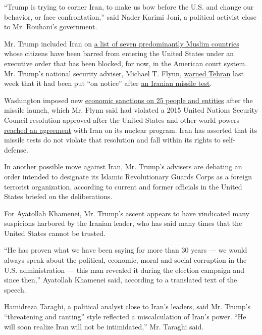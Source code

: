 ``Trump is trying to corner Iran, to make us bow before the U.S. and
change our behavior, or face confrontation,'' said Nader Karimi Joni, a
political activist close to Mr. Rouhani's government.

Mr. Trump included Iran on
\href{https://www.nytimes3xbfgragh.onion/interactive/2017/01/31/us/politics/trump-immigration-ban-groups.html}{a
list of seven predominantly Muslim countries} whose citizens have been
barred from entering the United States under an executive order that has
been blocked, for now, in the American court system. Mr. Trump's
national security adviser, Michael T. Flynn,
\href{https://www.nytimes3xbfgragh.onion/2017/02/01/world/middleeast/iran-missile-test.html}{warned
Tehran} last week that it had been put ``on notice'' after
\href{https://www.nytimes3xbfgragh.onion/2017/01/30/world/middleeast/iran-missile-test.html}{an
Iranian missile test}.

Washington imposed new
\href{https://www.nytimes3xbfgragh.onion/2017/02/03/us/politics/iran-sanctions-trump.html}{economic
sanctions on 25 people and entities} after the missile launch, which Mr.
Flynn said had violated a 2015 United Nations Security Council
resolution approved after the United States and other world powers
\href{https://www.nytimes3xbfgragh.onion/interactive/2015/03/31/world/middleeast/simple-guide-nuclear-talks-iran-us.html}{reached
an agreement} with Iran on its nuclear program. Iran has asserted that
its missile tests do not violate that resolution and fall within its
rights to self-defense.

In another possible move against Iran, Mr. Trump's advisers are debating
an order intended to designate its Islamic Revolutionary Guards Corps as
a foreign terrorist organization, according to current and former
officials in the United States briefed on the deliberations.

For Ayatollah Khamenei, Mr. Trump's ascent appears to have vindicated
many suspicions harbored by the Iranian leader, who has said many times
that the United States cannot be trusted.

``He has proven what we have been saying for more than 30 years --- we
would always speak about the political, economic, moral and social
corruption in the U.S. administration --- this man revealed it during
the election campaign and since then,'' Ayatollah Khamenei said,
according to a translated text of the speech.

Hamidreza Taraghi, a political analyst close to Iran's leaders, said Mr.
Trump's ``threatening and ranting'' style reflected a miscalculation of
Iran's power. ``He will soon realize Iran will not be intimidated,'' Mr.
Taraghi said.

